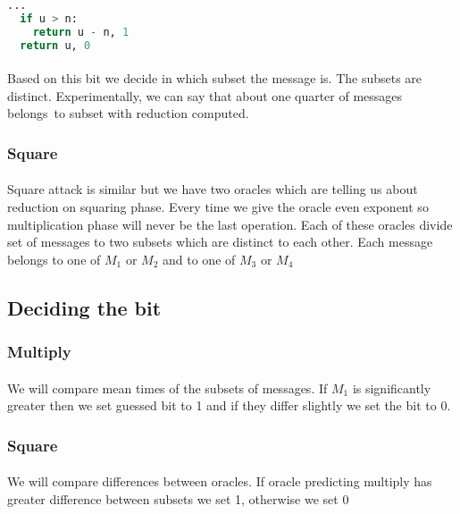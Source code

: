 \documentclass[thesis=B,english]{FITthesis}[2012/10/20]
\begin{document}
{\begin{lstlisting}[language=Python]
  ...
  if u > n:
    return u - n, 1
  return u, 0
\end{lstlisting}

\paragraph*{}
{
Based on this bit we decide in which subset the message is. The subsets are distinct. Experimentally, we can say that about one quarter of messages belongs~to
subset with reduction computed.
}
\subsubsection{Square}
\paragraph*{}{
Square attack is similar but we have two oracles which are telling us about reduction on squaring phase. Every time we give the oracle even exponent so 
multiplication phase will never be the last operation. Each of these oracles divide set of messages to two subsets which are distinct to each other. Each message 
belongs to one of \(M_1\) or \(M_2\) and to one of \(M_3\) or \(M_4\)
}

\subsection{Deciding the bit}

\subsubsection{Multiply}
\paragraph*{}{
We will compare mean times of the subsets of messages. If \(M_1\) is significantly greater then we set guessed bit to 1 and if they differ slightly we set the bit to 0. 

}

\subsubsection{Square}
\paragraph*{}{
We will compare differences between oracles. If oracle predicting multiply has greater difference between subsets we set 1, otherwise we set 0
}

}
\end{document}
